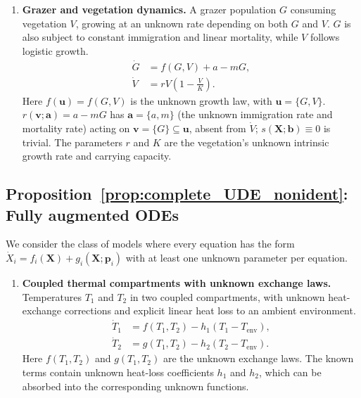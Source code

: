 \documentclass{article}
\theoremstyle{plain}
\theoremstyle{definition}
\renewcommand{\vec}[1]{\boldsymbol{#1}}
\begin{document}
{\begin{enumerate}
    \item \textbf{Grazer and vegetation dynamics.} A grazer population $G$ consuming vegetation $V$, growing at an unknown rate depending on both $G$ and $V$. $G$ is also subject to constant immigration and linear mortality, while $V$ follows logistic growth.
    \begin{align*}
        \dot{G} &= f(G,V) + a - mG, \\
        \dot{V} &= rV\!\left(1 - \frac{V}{K}\right).
    \end{align*}
    Here $f(\vec{u}) = f(G,V)$ is the unknown growth law, with $\vec{u} = \{G,V\}$. $r(\vec{v};\vec{a}) = a - mG$ has $\vec{a} = \{a,m\}$ (the unknown immigration rate and mortality rate) acting on $\vec{v} = \{G\} \subseteq \vec{u}$, absent from $\dot{V}$; $s(\vec{X};\vec{b}) \equiv 0$ is trivial. The parameters $r$ and $K$ are the vegetation's unknown intrinsic growth rate and carrying capacity.
    
\end{enumerate}


\subsection{Proposition~\ref{prop:complete_UDE_nonident}: Fully augmented ODEs} \label{appendix:examples_complete}

We consider the class of models where every equation has the form $\dot{X}_i = f_i(\vec{X}) + g_i(\vec{X};\vec{p}_i)$ with at least one unknown parameter per equation.

\begin{enumerate}
    \item \textbf{Coupled thermal compartments with unknown exchange laws.} Temperatures $T_1$ and $T_2$ in two coupled compartments, with unknown heat-exchange corrections and explicit linear heat loss to an ambient environment.
    \begin{align*}
        \dot{T}_1 &= f(T_1,T_2) - h_1(T_1 - T_{\mathrm{env}}), \\
        \dot{T}_2 &= g(T_1,T_2) - h_2(T_2 - T_{\mathrm{env}}).
    \end{align*}
    Here $f(T_1,T_2)$ and $g(T_1,T_2)$ are the unknown exchange laws. The known terms contain unknown heat-loss coefficients $h_1$ and $h_2$, which can be absorbed into the corresponding unknown functions.


\end{enumerate}}
\end{document}
